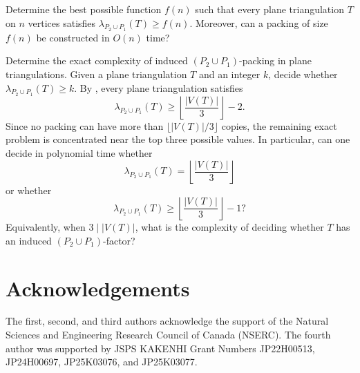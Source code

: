\documentclass{patmorin}
\begin{document}
\begin{op}\label{ques:algorithmic-p2p1-packing}
Determine the best possible function $f(n)$ such that every plane
triangulation $T$ on $n$ vertices satisfies $\lambda_{P_2\cup P_1}(T)\ge f(n)$.
Moreover, can a packing of size $f(n)$ be constructed in
$O(n)$ time?
\end{op}

\begin{op}\label{ques:complexity-induced-p2p1}
Determine the exact complexity of induced $(P_2\cup P_1)$-packing in plane triangulations.
Given a plane triangulation $T$ and an integer $k$, decide whether
$\lambda_{P_2\cup P_1}(T)\ge k$.
By , every plane triangulation satisfies
\[
\lambda_{P_2\cup P_1}(T)
\ge
\left\lfloor \frac{|V(T)|}{3}\right\rfloor-2.
\]
Since no packing can have more than $\lfloor |V(T)|/3\rfloor$ copies, the
remaining exact problem is concentrated near the top three possible values.
In particular, can one decide in polynomial time whether
\[
\lambda_{P_2\cup P_1}(T)
=
\left\lfloor \frac{|V(T)|}{3}\right\rfloor
\]
or whether
\[
\lambda_{P_2\cup P_1}(T)
\ge
\left\lfloor \frac{|V(T)|}{3}\right\rfloor-1?
\]
Equivalently, when $3\mid |V(T)|$, what is the complexity of deciding whether
$T$ has an induced $(P_2\cup P_1)$-factor?
\end{op}

\section*{Acknowledgements}

The first, second, and third authors acknowledge the support of the Natural Sciences and Engineering Research Council of Canada (NSERC). The fourth author was supported by JSPS KAKENHI Grant Numbers JP22H00513, JP24H00697, JP25K03076, and JP25K03077.



\end{document}
